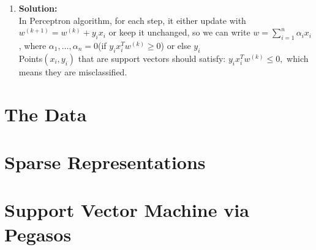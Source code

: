 \documentclass[ruled]{article}
\begin{document}
\begin{enumerate}
\item 
\textbf{Solution:}\\
In Perceptron algorithm, for each step, it either update with $w^{(k+1)}=w^{(k)}+y_{i}x_{i}$ or keep it unchanged, so we can write $w=\sum_{i=1}^{n}\alpha_{i}x_{i}$, where $\alpha_{1},\ldots,\alpha_{n} = 0$(if $y_{i}x_{i}^{T}w^{(k)}\ge0$) or else $y_{i}$\\
Points$(x_{i}, y_{i})$ that are support vectors should satisfy: $ y_{i}x_{i}^{T}w^{(k)}\le0,$
which means they are misclassified.
\end{enumerate}

\section{The Data}


\section{Sparse Representations}


\section{Support Vector Machine via Pegasos}
\end{document}

